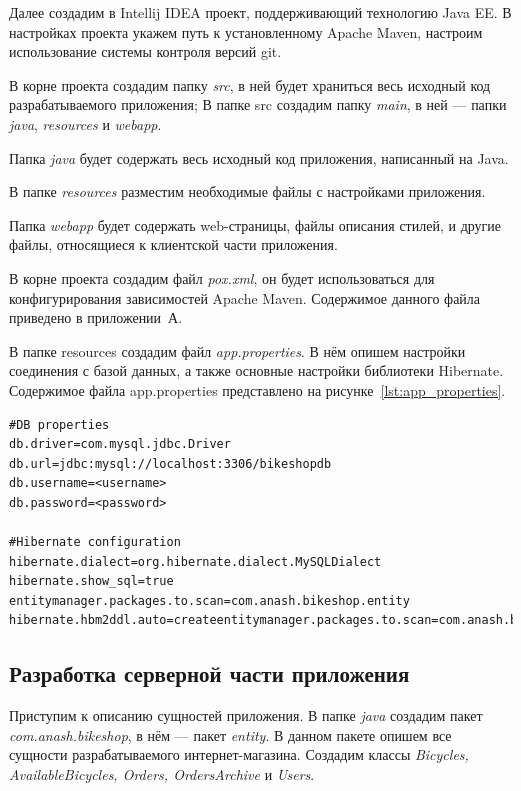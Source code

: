 Далее создадим в Intellij IDEA проект, поддерживающий технологию Java EE.
В настройках проекта укажем путь к установленному Apache Maven,
настроим использование системы контроля версий git.

В корне проекта создадим папку \textit{src}, в ней будет храниться весь исходный
код разрабатываемого приложения; В папке src создадим папку \textit{main}, в ней ---
папки \textit{java}, \textit{resources} и \textit{webapp}.

Папка \textit{java} будет содержать весь исходный код приложения, написанный на Java.

В папке \textit{resources} разместим необходимые файлы с настройками приложения.

Папка \textit{webapp} будет содержать web-страницы, файлы описания стилей, и другие файлы,
относящиеся к клиентской части приложения.

В корне проекта создадим файл \textit{pox.xml}, он будет использоваться для
конфигурирования зависимостей Apache Maven. Содержимое данного файла
приведено в приложении~А.

В папке resources создадим файл \textit{app.properties}. В нём опишем настройки
соединения с базой данных, а также основные настройки библиотеки Hibernate.
Содержимое файла app.properties представлено на рисунке~\ref{lst:app_properties}.

\begin{lstlisting}[caption=Содержимое файла app.properties,label=lst:app_properties]
#DB properties
db.driver=com.mysql.jdbc.Driver
db.url=jdbc:mysql://localhost:3306/bikeshopdb
db.username=<username>
db.password=<password>

#Hibernate configuration
hibernate.dialect=org.hibernate.dialect.MySQLDialect
hibernate.show_sql=true
entitymanager.packages.to.scan=com.anash.bikeshop.entity
hibernate.hbm2ddl.auto=createentitymanager.packages.to.scan=com.anash.bikeshop.entity
\end{lstlisting}

\newpage

\subsection{Разработка серверной части приложения}

Приступим к описанию сущностей приложения. В папке \textit{java} создадим пакет
\textit{com.anash.bikeshop}, в нём --- пакет \textit{entity}. В данном пакете опишем
все сущности разрабатываемого интернет-магазина. Создадим классы
\textit{Bicycles, AvailableBicycles, Orders, OrdersArchive} и \textit{Users}.

